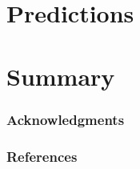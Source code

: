 \documentclass{article} %
\begin{document}
\section{Predictions}

\section{Summary}

\subsubsection*{Acknowledgments}

\subsubsection*{References}
\end{document}
